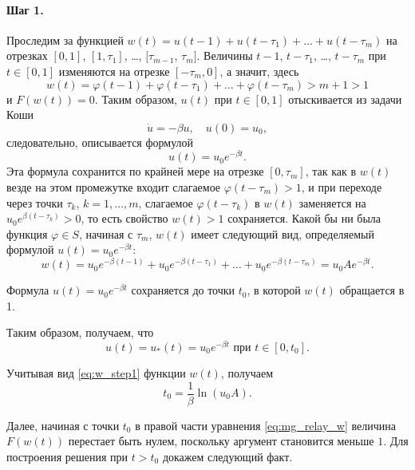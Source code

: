 \paragraph{Шаг 1.} 
Проследим за функцией $w(t)=u(t-1)+u(t-\tau_1)+\ldots+u(t-\tau_m)$ на отрезках $[0, 1]$, $[1, \tau_1]$, \dots, $[\tau_{m-1}$, $\tau_{m}]$. Величины $t - 1$, $t - \tau_1$, \dots, $t - \tau_m$ при $t \in [0,1]$ изменяются на отрезке $[-\tau_m,0]$, а значит, здесь 
%
\begin{equation*}
	w(t)=\varphi(t-1)+\varphi(t-\tau_1)+\ldots+\varphi(t-\tau_m) > m+1 > 1
\end{equation*}
%
и $F(w(t))=0$. Таким образом, 
$u(t)$ при $t\in[0,1]$ отыскивается из задачи Коши 
%
\begin{equation*}
	\dot{u}=-\beta u,\quad u(0)=u_0,
\end{equation*}
%
следовательно, описывается формулой 
%
\begin{equation*}
	u(t)=u_0e^{-\beta t}.
\end{equation*}
%
Эта формула сохранится по крайней мере на отрезке $[0,\tau_m]$, так как в $w(t)$ везде на этом промежутке входит слагаемое $\varphi(t - \tau_m) > 1$, и при переходе через точки $\tau_k$, $k = 1, \ldots, m$, слагаемое $\varphi(t-\tau_k)$ в $w(t)$ заменяется на $u_0e^{\beta (t-\tau_k)} > 0$, то есть свойство $w(t) > 1$ сохраняется. Какой бы ни была функция $\varphi\in S$, начиная с $\tau_m$, $w(t)$ имеет следующий вид, определяемый формулой $u(t)=u_0e^{-\beta t}$:
\begin{equation}
	\label{eq:w_step1}
	w(t)=u_0 e^{-\beta(t-1)} + u_0 e^{-\beta(t-\tau_1)} + \ldots + u_0 e^{-\beta(t-\tau_m)}=u_0 A e^{-\beta t}.
\end{equation} 

Формула $u(t)=u_0 e^{-\beta t}$ сохраняется до точки $t_0$, в которой $w(t)$ обращается в 1.

Таким образом, получаем, что 
\begin{equation}
	\label{eq:u_step1}
	u(t)=u_*(t)=u_0e^{-\beta t} \text{ при }t\in[0, t_0].
\end{equation}

Учитывая вид \eqref{eq:w_step1} функции $w(t)$, получаем \begin{equation}
	\label{eq:t0}
	t_0 = \frac{1}{\beta}\ln(u_0 A).
\end{equation}

Далее, начиная с точки $t_0$ в правой части уравнения \eqref{eq:mg_relay_w} величина $F(w(t))$ перестает быть нулем, поскольку аргумент становится меньше $1$. Для построения решения при $t > t_0$ докажем следующий факт.

